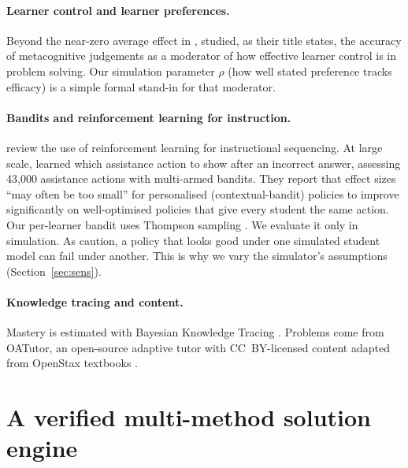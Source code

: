 \documentclass[11pt,a4paper]{article}
\begin{document}
\paragraph{Learner control and learner preferences.}
Beyond the near-zero average effect in \citet{karich2014updated}, \citet{mihalca2017accuracy}
studied, as their title states, the accuracy of metacognitive judgements as a moderator
of how effective learner control is in problem solving. Our simulation
parameter $\rho$ (how well stated preference tracks efficacy) is a simple formal stand-in for
that moderator.

\paragraph{Bandits and reinforcement learning for instruction.}
\citet{doroudi2019where} review the use of reinforcement learning for instructional
sequencing. At large scale, \citet{schmucker2025learning} learned which assistance action
to show after an incorrect answer, assessing 43,000 assistance actions with multi-armed
bandits. They report that effect sizes ``may often be too small'' for personalised
(contextual-bandit) policies to improve significantly on well-optimised policies that give
every student the same action. Our per-learner bandit uses
Thompson sampling \citep{thompson1933likelihood,russo2018tutorial}. We evaluate it only in
simulation. As \citet{doroudi2017robust} caution, a policy that looks good under one
simulated student model can fail under another. This is why we vary the simulator's
assumptions (Section~\ref{sec:sens}).

\paragraph{Knowledge tracing and content.}
Mastery is estimated with Bayesian Knowledge Tracing \citep{corbett1995knowledge}. Problems
come from OATutor, an open-source adaptive tutor with CC~BY-licensed content adapted from
OpenStax textbooks \citep{pardos2023oatutor}.

\section{A verified multi-method solution engine}
\label{sec:engine}
\end{document}
